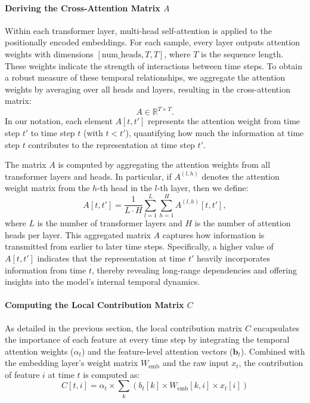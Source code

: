 \documentclass[letterpaper]{article}
\begin{document}
\begin{enumerate}
\paragraph{Deriving the Cross-Attention Matrix  \( A \)} 

Within each transformer layer, multi-head self-attention is applied to the positionally encoded embeddings. For each sample, every layer outputs attention weights with dimensions \([\text{num\_heads}, T, T]\), where \( T \) is the sequence length. These weights indicate the strength of interactions between time steps. To obtain a robust measure of these temporal relationships, we aggregate the attention weights by averaging over all heads and layers, resulting in the cross-attention matrix:
\[
A \in \mathbb{R}^{T \times T}.
\]
In our notation, each element \( A[t, t'] \) represents the attention weight from time step \( t' \) to time step \( t \) (with \( t < t' \)), quantifying how much the information at time step \( t \) contributes to the representation at time step \( t' \).

The matrix \( A \) is computed by aggregating the attention weights from all transformer layers and heads. In particular, if \( A^{(l, h)} \) denotes the attention weight matrix from the \( h \)-th head in the \( l \)-th layer, then we define:
\[
A[t, t'] = \frac{1}{L \cdot H} \sum_{l=1}^{L} \sum_{h=1}^{H} A^{(l, h)}[t, t'],
\]
where \( L \) is the number of transformer layers and \( H \) is the number of attention heads per layer. This aggregated matrix \( A \) captures how information is transmitted from earlier to later time steps. Specifically, a higher value of \( A[t, t'] \) indicates that the representation at time \( t' \) heavily incorporates information from time \( t \), thereby revealing long-range dependencies and offering insights into the model's internal temporal dynamics.

\paragraph{Computing the Local Contribution Matrix \( C \)}

As detailed in the previous section, the local contribution matrix \( C \) encapsulates the importance of each feature at every time step by integrating the temporal attention weights (\( \alpha_t \)) and the feature-level attention vectors (\( \mathbf{b}_t \)). Combined with the embedding layer's weight matrix \( W_{\mathrm{emb}} \) and the raw input \( x_t \), the contribution of feature \( i \) at time \( t \) is computed as:
\[
C[t, i] = \alpha_t \times \sum_{k} \left( b_t[k] \times W_{\mathrm{emb}}[k, i] \times x_t[i] \right)
\]


\end{enumerate}
\end{document}
